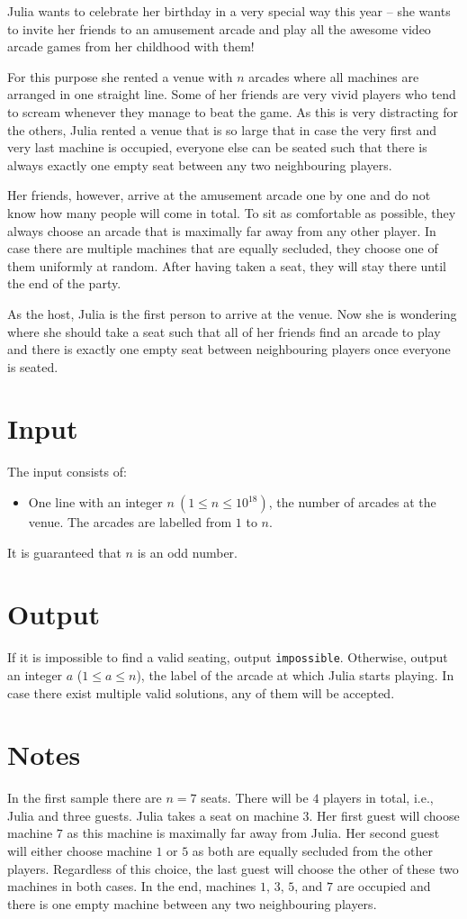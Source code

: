 
Julia wants to celebrate her birthday in a very special way this year -- she wants to invite her friends to an amusement arcade and play all the awesome video arcade games from her childhood with them! 

For this purpose she rented a venue with $n$ arcades where all machines are arranged in one straight line. Some of her friends are very vivid players who tend to scream whenever they manage to beat the game. As this is very distracting for the others, Julia rented a venue that is so large that in case the very first and very last machine is occupied, everyone else can be seated such that there is always exactly one empty seat between any two neighbouring players.

Her friends, however, arrive at the amusement arcade one by one and do not know how many people will come in total. To sit as comfortable as possible, they always choose an arcade that is maximally far away from any other player. In case there are multiple machines that are equally secluded, they choose one of them uniformly at random. After having taken a seat, they will stay there until the end of the party.

As the host, Julia is the first person to arrive at the venue. Now she is wondering where she should take a seat such that all of her friends find an arcade to play and there is exactly one empty seat between neighbouring players once everyone is seated.

\section*{Input}
The input consists of:
\begin{itemize}
	\item One line with an integer $n\ (1 \le n \le 10^{18})$, the number of arcades at the venue. The arcades are labelled from $1$ to $n$.
\end{itemize}
It is guaranteed that $n$ is an odd number.


\section*{Output}
If it is impossible to find a valid seating, output \texttt{impossible}. Otherwise, output an integer $a$ ($1 \le a \le n$), the label of the arcade at which Julia starts playing. In case there exist multiple valid solutions, any of them will be accepted.

\section*{Notes}
In the first sample there are $n=7$ seats. There will be $4$ players in total, i.e., Julia and three guests. Julia takes a seat on machine $3$. Her first guest will choose machine $7$ as this machine is maximally far away from Julia. Her second guest will either choose machine $1$ or $5$ as both are equally secluded from the other players. Regardless of this choice, the last guest will choose the other of these two machines in both cases. In the end, machines $1$, $3$, $5$, and $7$ are occupied and there is one empty machine between any two neighbouring players.
